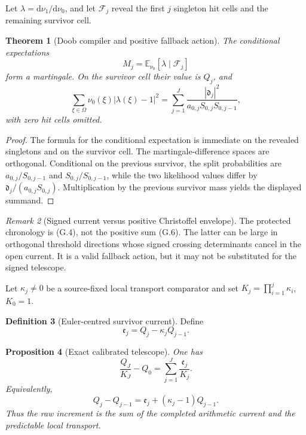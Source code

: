 \documentclass[11pt]{article}
\newtheorem{theorem}{Theorem}[section]
\newtheorem{proposition}[theorem]{Proposition}
\theoremstyle{definition}
\newtheorem{definition}[theorem]{Definition}
\theoremstyle{remark}
\newtheorem{remark}[theorem]{Remark}
\newcommand{\dd}{\mathrm d}
\begin{document}
Let \(\lambda=\dd\nu_1/\dd\nu_0\), and let \(\mathscr F_j\) reveal the
first \(j\) singleton hit cells and the remaining survivor cell.

\begin{theorem}[Doob compiler and positive fallback action]
\label{thm:grhouter-survivor-Pythagoras}
The conditional expectations
\[
 M_j=\mathbb E_{\nu_0}[\lambda\mid\mathscr F_j]
\]
form a martingale.  On the survivor cell their value is \(Q_j\), and
\[
 \boxed{
 \sum_{\xi\in\Omega}\nu_0(\xi)|\lambda(\xi)-1|^2
 =\sum_{j=1}^{J}
   \frac{|\mathfrak d_j|^2}
        {a_{0,j}S_{0,j}S_{0,j-1}},}
 \tag{G.6}
\]
with zero hit cells omitted.
\end{theorem}

\begin{proof}
The formula for the conditional expectation is immediate on the revealed
singletons and on the survivor cell.  The martingale-difference spaces are
orthogonal.  Conditional on the previous survivor, the split probabilities
are \(a_{0,j}/S_{0,j-1}\) and \(S_{0,j}/S_{0,j-1}\), while the two likelihood
values differ by \(\mathfrak d_j/(a_{0,j}S_{0,j})\).  Multiplication by the
previous survivor mass yields the displayed summand.
\end{proof}

\begin{remark}[Signed current versus positive Christoffel envelope]
The protected chronology is \textup{(G.4)}, not the positive sum
\textup{(G.6)}.  The latter can be large in orthogonal threshold directions
whose signed crossing determinants cancel in the open current.  It is a valid
fallback action, but it may not be substituted for the signed telescope.
\end{remark}

Let \(\kappa_j\ne0\) be a source-fixed local transport comparator and set
\(K_j=\prod_{i=1}^j\kappa_i\), \(K_0=1\).

\begin{definition}[Euler-centred survivor current]
\label{def:grhouter-Euler-centred}
Define
\[
 \boxed{
 \mathfrak e_j=Q_j-\kappa_jQ_{j-1}.}
 \tag{G.7}
\]
\end{definition}

\begin{proposition}[Exact calibrated telescope]
\label{prop:grhouter-calibrated-telescope}
One has
\[
 \boxed{
 \frac{Q_J}{K_J}-Q_0
 =\sum_{j=1}^{J}\frac{\mathfrak e_j}{K_j}.}
 \tag{G.8}
\]
Equivalently,
\[
 Q_j-Q_{j-1}
 =\mathfrak e_j+(\kappa_j-1)Q_{j-1}.
 \tag{G.9}
\]
Thus the raw increment is the sum of the completed arithmetic current and the
predictable local transport.
\end{proposition}
\end{document}
